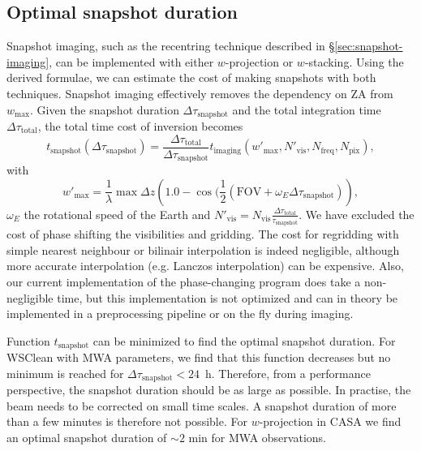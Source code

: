 \documentclass[useAMS,usenatbib]{mn2e}
\begin{document}
\subsection{Optimal snapshot duration}
Snapshot imaging, such as the recentring technique described in \S\ref{sec:snapshot-imaging}, can be implemented with either $w$-projection or $w$-stacking. Using the derived formulae, we can estimate the cost of making snapshots with both techniques. Snapshot imaging effectively removes the dependency on ZA from $w_{\max}$. Given the snapshot duration $\Delta \tau_\textrm{snapshot}$ and the total integration time $\Delta \tau_\textrm{total}$, the total time cost of inversion becomes
\begin{equation} \label{eq:snapshot-cost}
t_\textrm{snapshot}(\Delta \tau_\textrm{snapshot}) = \frac{\Delta \tau_\textrm{total}}{\Delta \tau_\textrm{snapshot}} t_\textrm{imaging}(w'_{\max},N'_\textrm{vis},N_\textrm{freq},N_\textrm{pix}),
\end{equation}
with
\begin{equation}
w'_{\max} = \frac{1}{\lambda}\max \Delta z \left(1.0 - \cos(\frac{1}{2}(\textrm{FOV} + \omega_E \Delta \tau_\textrm{snapshot})\right),
\end{equation}
$\omega_E$ the rotational speed of the Earth and $N'_\textrm{vis} = N_\textrm{vis}\frac{\Delta \tau_\textrm{total}}{\tau_\textrm{snapshot}}$. We have excluded the cost of phase shifting the visibilities and gridding. The cost for regridding with simple nearest neighbour or bilinair interpolation is indeed negligible, although more accurate interpolation (e.g. Lanczos interpolation) can be expensive. Also, our current implementation of the phase-changing program does take a non-negligible time, but this implementation is not optimized and can in theory be implemented in a preprocessing pipeline or on the fly during imaging.

Function $t_\textrm{snapshot}$ can be minimized to find the optimal snapshot duration. For WSClean with MWA parameters, we find that this function decreases but no minimum is reached for $\Delta \tau_\textrm{snapshot}<24$~h. Therefore, from a performance perspective, the snapshot duration should be as large as possible. In practise, the beam needs to be corrected on small time scales. A snapshot duration of more than a few minutes is therefore not possible. For $w$-projection in CASA we find an optimal snapshot duration of $\sim2$ min for MWA observations.
\end{document}
